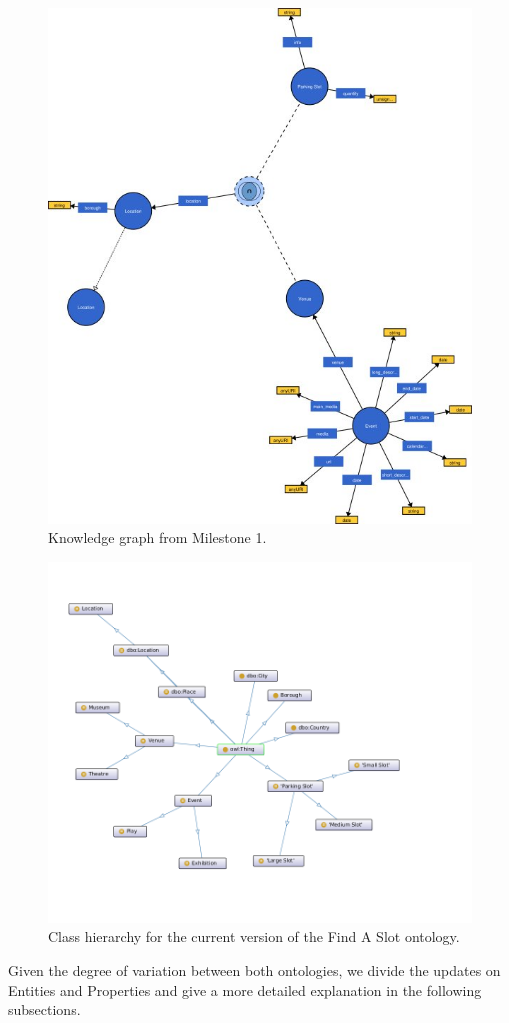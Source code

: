\documentclass[runningheads,a4paper]{../../StyleFiles/llncs}
\begin{document}
\begin{figure}[h]\centering
	\includegraphics[width=.7\textwidth]{img/old_ontology.jpg}
	\caption{Knowledge graph from Milestone 1.}
	\label{fig:old_ontology}
\end{figure}
\begin{figure}[h] \centering
	\includegraphics[width=.7\textwidth]{img/ontology-classes.png}
	\caption{Class hierarchy for the current version of the Find A Slot ontology.}
	\label{fig:ontology-classes}
\end{figure}

Given the degree of variation between both ontologies, we divide the updates on Entities and Properties and give a more detailed explanation in the following subsections.
\end{document}

